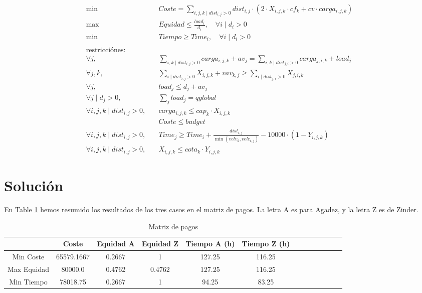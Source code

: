 \documentclass[]{article}
\begin{document}
\begin{align*}
	\min \; & Coste = \sum_{i,j,k \mid dist_{i,j} > 0} dist_{i,j}\cdot (2\cdot X_{i,j,k}\cdot cf_{k}+cv\cdot carga_{i,j,k})\\
	\max \; & Equidad \leq  \frac{load_i}{d_i}, \quad \forall i \mid d_i > 0\\
	\min \; & Tiempo \geq Time_i, \quad \forall i \mid d_i > 0\\ \\
	\text{restricciónes:}&\\
	\forall j, \quad &\sum_{i,k \mid dist_{i,j} > 0} carga_{i,j,k} + av_j = \sum_{i,k \mid dist_{j,i} > 0}  carga_{j,i,k} + load_j\\
	\forall j,k, \quad &\sum_{i \mid dist_{i,j} > 0} X_{i,j,k} + vav_{k,j} \geq \sum_{i \mid dist_{j,i} > 0} X_{j,i,k}\\
	\forall j, \quad &load_j \leq d_j + av_j\\
	\forall j \mid d_j > 0, \quad &\sum_j load_j = qglobal\\
	\forall i,j,k \mid dist_{i,j} > 0, \quad & carga_{i,j,k} \leq cap_k \cdot X_{i,j,k}\\
	& Coste \leq budget\\
	\forall i,j,k \mid dist_{i,j} > 0, \quad & Time_j \geq Time_i + \frac{dist_{i,j}}{\min(velv_k, velc_{i,j})} - 10000\cdot (1-Y_{i,j,k})\\
	\forall i,j,k \mid dist_{i,j} > 0, \quad & X_{i,j,k} \leq cota_k \cdot Y_{i,j,k}
\end{align*}

\section{Solución}
En Table \ref{tab:dfdg} hemos resumido los resultados de los tres casos en el matriz de pagos. La letra A es para Agadez, y la letra Z es de Zinder.

\begin{table}[H]
\begin{center}
\begin{tabular}{|c|c|c|c|c|c|c|c|c|c|c|c|c|}
\hline
$$ & Coste  &  Equidad A & Equidad Z & Tiempo A (h) & Tiempo Z (h) \\ \hline
  Min Coste  & 65579.1667 &    0.2667  &   1   &  127.25 & 116.25  \\
  Max Equidad  &  80000.0 &   0.4762  &   0.4762  &  127.25 & 116.25  \\
  Min Tiempo  &  78018.75 &     0.2667  &   1   &  94.25 & 83.25  \\
\hline
\end{tabular}
\caption{Matriz de pagos}
\label{tab:dfdg}
\end{center}
\end{table}
\end{document}
